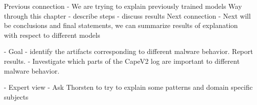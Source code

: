Previous connection
- We are trying to explain previously trained models
Way through this chapter
- describe steps
- discuss results
Next connection
- Next will be conclusions and final statements, we can summarize results of explanation with respect to different models


- Goal 
- identify the artifacts corresponding to different malware behavior. Report results.
- Investigate which parts of the CapeV2 log are important to different malware behavior. 

- Expert view
  - Ask Thorsten to try to explain some patterns and domain specific subjects 


